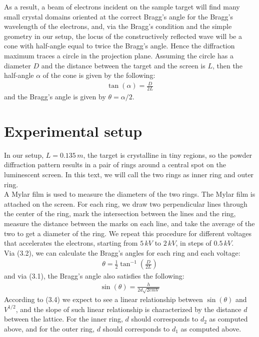 \documentclass[11pt]{book}
\theoremstyle{break}
\theoremstyle{break}
\begin{document}
As a result, a beam of electrons incident on the sample target will find many small crystal domains oriented at the correct Bragg's angle for the Bragg's wavelength of the electrons, and, via the Bragg's condition and the simple geometry in our setup, the locus of the constructively reflected wave will be a cone with half-angle equal to twice the Bragg's angle. Hence the diffraction maximum traces a circle in the projection plane. Assuming the circle has a diameter $D$ and the distance between the target and the screen is $L$, then the half-angle $\alpha$ of the cone is given by the following:
\begin{align}
\tan(\alpha) = \frac{D}{2L}
\end{align}
and the Bragg's angle is given by $\theta = \alpha /2$. 

\hfill\break
\section{Experimental setup} In our setup, $L = 0.135\, m$, the target is crystalline in tiny regions, so the powder diffraction pattern results in a pair of rings around a central spot on the luminescent screen. In this text, we will call the two rings as inner ring and outer ring.\\

A Mylar film is used to measure the diameters of the two rings. The Mylar film is attached on the screen. For each ring, we draw two perpendicular lines through the center of the ring, mark the intersection between the lines and the ring, measure the distance between the marks on each line, and take the average of the two to get a diameter of the ring. We repeat this procedure for different voltages that accelerates the electrons, starting from $5\, kV$ to $2\, kV$, in steps of $0.5\, kV$. \\

Via (3.2), we can calculate the Bragg's angles for each ring and each voltage:
\begin{align}
\theta = \frac{1}{2}\tan^{-1}\left( \frac{D}{2L}\right)
\end{align}
and via (3.1), the Bragg's angle also satisfies the following:
\begin{align}
\sin(\theta) = \frac{h}{2d\sqrt{2emV}}
\end{align}
According to (3.4) we expect to see a linear relationship between $\sin(\theta)$ and $V^{1/2}$, and the slope of such linear relationship is characterized by the distance $d$ between the lattice. For the inner ring, $d$ should corresponds to $d_2$ as computed above, and for the outer ring, $d$ should corresponds to $d_1$ as computed above. 
 
\end{document}
